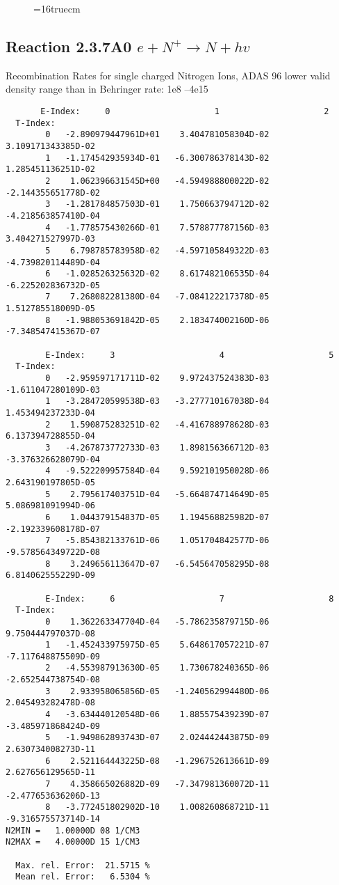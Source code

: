 \documentclass[12pt,dvipdfmx]{article}
\begin{document}
\begin{figure} \label{2.3.6A0}
\epsfxsize=16truecm
\end{figure}
\newpage
\subsection{
Reaction 2.3.7A0  $e + N^{+} \rightarrow N + hv$ }
 Recombination Rates for single  charged Nitrogen Ions, ADAS 96
 lower valid density range than in Behringer rate: 1e8 --4e15

\begin{small}\begin{verbatim}
       E-Index:     0                     1                     2
  T-Index:
        0   -2.890979447961D+01    3.404781058304D-02    3.109171343385D-02
        1   -1.174542935934D-01   -6.300786378143D-02    1.285451136251D-02
        2    1.062396631545D+00   -4.594988800022D-02   -2.144355651778D-02
        3   -1.281784857503D-01    1.750663794712D-02   -4.218563857410D-04
        4   -1.778575430266D-01    7.578877787156D-03    3.404271527997D-03
        5    6.798785783958D-02   -4.597105849322D-03   -4.739820114489D-04
        6   -1.028526325632D-02    8.617482106535D-04   -6.225202836732D-05
        7    7.268082281380D-04   -7.084122217378D-05    1.512785518009D-05
        8   -1.988053691842D-05    2.183474002160D-06   -7.348547415367D-07

        E-Index:     3                     4                     5
  T-Index:
        0   -2.959597171711D-02    9.972437524383D-03   -1.611047280109D-03
        1   -3.284720599538D-03   -3.277710167038D-04    1.453494237233D-04
        2    1.590875283251D-02   -4.416788978628D-03    6.137394728855D-04
        3   -4.267873772733D-03    1.898156366712D-03   -3.376326628079D-04
        4   -9.522209957584D-04    9.592101950028D-06    2.643190197805D-05
        5    2.795617403751D-04   -5.664874714649D-05    5.086981091994D-06
        6    1.044379154837D-05    1.194568825982D-07   -2.192339608178D-07
        7   -5.854382133761D-06    1.051704842577D-06   -9.578564349722D-08
        8    3.249656113647D-07   -6.545647058295D-08    6.814062555229D-09

        E-Index:     6                     7                     8
  T-Index:
        0    1.362263347704D-04   -5.786235879715D-06    9.750444797037D-08
        1   -1.452433975975D-05    5.648617057221D-07   -7.117648875509D-09
        2   -4.553987913630D-05    1.730678240365D-06   -2.652544738754D-08
        3    2.933958065856D-05   -1.240562994480D-06    2.045493282478D-08
        4   -3.634440120548D-06    1.885575439239D-07   -3.485971868424D-09
        5   -1.949862893743D-07    2.024442443875D-09    2.630734008273D-11
        6    2.521164443225D-08   -1.296752613661D-09    2.627656129565D-11
        7    4.358665026882D-09   -7.347981360072D-11   -2.477653636206D-13
        8   -3.772451802902D-10    1.008260868721D-11   -9.316575573714D-14
N2MIN =   1.00000D 08 1/CM3
N2MAX =   4.00000D 15 1/CM3

  Max. rel. Error:  21.5715 %
  Mean rel. Error:   6.5304 %

\end{verbatim}\end{small}
\end{document}
